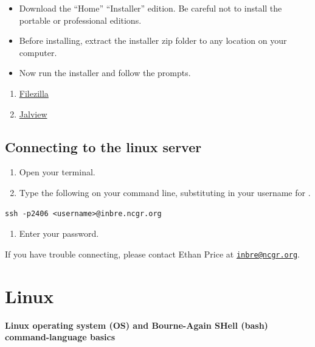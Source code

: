 \documentclass[
]{book}
\providecommand{\tightlist}{%
  \setlength{\itemsep}{0pt}\setlength{\parskip}{0pt}}
\begin{document}
\begin{itemize}
\item
  Download the ``Home'' ``Installer'' edition. Be careful not to install the portable or professional editions.
\item
  Before installing, extract the installer zip folder to any location on your computer.
\item
  Now run the installer and follow the prompts.
\end{itemize}

\begin{enumerate}
\def\labelenumi{\arabic{enumi}.}
\setcounter{enumi}{3}
\item
  \href{https://filezilla-project.org/}{Filezilla}
\item
  \href{https://www.jalview.org/}{Jalview}
\end{enumerate}

\hypertarget{connecting-to-the-linux-server}{%
\section{Connecting to the linux server}\label{connecting-to-the-linux-server}}

\begin{enumerate}
\def\labelenumi{\arabic{enumi}.}
\item
  Open your terminal.
\item
  Type the following on your command line, substituting in your username for .
\end{enumerate}

\begin{verbatim}
ssh -p2406 <username>@inbre.ncgr.org
\end{verbatim}

\begin{enumerate}
\def\labelenumi{\arabic{enumi}.}
\setcounter{enumi}{2}
\tightlist
\item
  Enter your password.
\end{enumerate}

If you have trouble connecting, please contact Ethan Price at \href{mailto:inbre@ncgr.org}{\nolinkurl{inbre@ncgr.org}}.

\hypertarget{linux}{%
\chapter{Linux}\label{linux}}

\textbf{Linux operating system (OS) and Bourne-Again SHell (bash) command-language basics}
\end{document}
